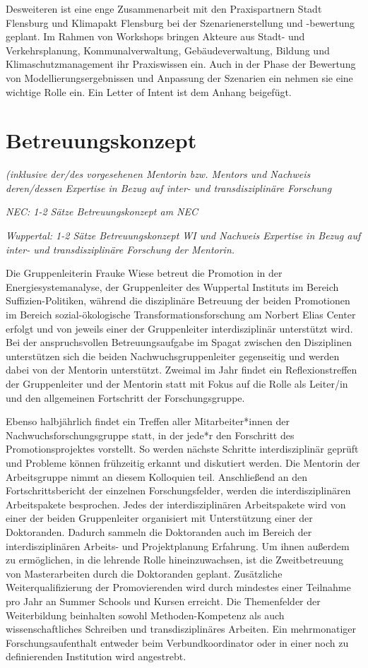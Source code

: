 \documentclass[a4paper,11pt,twoside]{scrartcl}
\begin{document}
Desweiteren ist eine enge Zusammenarbeit mit den Praxispartnern Stadt Flensburg und Klimapakt Flensburg bei der Szenarienerstellung und -bewertung geplant. Im Rahmen von Workshops bringen Akteure aus Stadt- und Verkehrsplanung, Kommunalverwaltung, Gebäudeverwaltung, Bildung und Klimaschutzmanagement ihr Praxiswissen ein. Auch in der Phase der Bewertung von Modellierungsergebnissen und Anpassung der Szenarien ein nehmen sie eine wichtige Rolle ein. Ein Letter of Intent ist dem Anhang beigefügt.


\section{Betreuungskonzept}
\textit{(inklusive der/des vorgesehenen Mentorin bzw. Mentors und Nachweis deren/dessen Expertise in Bezug auf inter- und transdisziplinäre Forschung}

\textit{NEC: 1-2 Sätze Betreuungskonzept am NEC}

\textit{Wuppertal: 1-2 Sätze Betreuungskonzept WI und Nachweis Expertise in Bezug auf inter- und transdisziplinäre Forschung der Mentorin.}

Die Gruppenleiterin Frauke Wiese betreut die Promotion in der Energiesystemanalyse, der Gruppenleiter des Wuppertal Instituts im Bereich Suffizien-Politiken, während die disziplinäre Betreuung der beiden Promotionen im Bereich sozial-ökologische Transformationsforschung am Norbert Elias Center erfolgt und von jeweils einer der Gruppenleiter interdisziplinär unterstützt wird. Bei der anspruchsvollen Betreuungsaufgabe im Spagat zwischen den Disziplinen unterstützen sich die beiden Nachwuchsgruppenleiter gegenseitig und werden dabei von der Mentorin unterstützt. Zweimal im Jahr findet ein Reflexionstreffen der Gruppenleiter und der Mentorin statt mit Fokus auf die Rolle als Leiter/in und den allgemeinen Fortschritt der Forschungsgruppe. 

Ebenso halbjährlich findet ein Treffen aller Mitarbeiter*innen der Nachwuchsforschungsgruppe statt, in der jede*r den Forschritt des Promotionsprojektes vorstellt. So werden nächste Schritte interdisziplinär geprüft und Probleme können frühzeitig erkannt und diskutiert werden. Die Mentorin der Arbeitsgruppe nimmt an diesem Kolloquien teil. Anschließend an den Fortschrittsbericht der einzelnen Forschungsfelder, werden die interdisziplinären Arbeitspakete besprochen. Jedes der interdisziplinären Arbeitspakete wird von einer der beiden Gruppenleiter organisiert mit Unterstützung einer der Doktoranden. Dadurch sammeln die Doktoranden auch im Bereich der interdisziplinären Arbeits- und Projektplanung Erfahrung. Um ihnen außerdem zu ermöglichen, in die lehrende Rolle hineinzuwachsen, ist die Zweitbetreuung von Masterarbeiten durch die Doktoranden geplant. Zusätzliche Weiterqualifizierung der Promovierenden wird durch mindestes einer Teilnahme pro Jahr an Summer Schools und Kursen erreicht. Die Themenfelder der Weiterbildung beinhalten sowohl Methoden-Kompetenz als auch wissenschaftliches Schreiben und transdisziplinäres Arbeiten. Ein mehrmonatiger Forschungsaufenthalt entweder beim Verbundkoordinator oder in einer noch zu definierenden Institution wird angestrebt.
\end{document}
